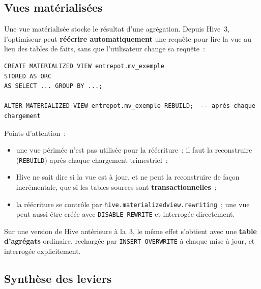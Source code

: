 \subsection{Vues matérialisées}

\noindent Une vue matérialisée stocke le résultat d'une agrégation. Depuis Hive~3, l'optimiseur peut \textbf{réécrire automatiquement} une requête pour lire la vue au lieu des tables de faits, sans que l'utilisateur change sa requête~:

\begin{center}
\begin{minipage}{0.92\textwidth}
\begin{tcolorbox}[colback=title2!6,colframe=title1,boxsep=2pt]
\begin{verbatim}
CREATE MATERIALIZED VIEW entrepot.mv_exemple
STORED AS ORC
AS SELECT ... GROUP BY ...;

ALTER MATERIALIZED VIEW entrepot.mv_exemple REBUILD;  -- après chaque chargement
\end{verbatim}
\end{tcolorbox}
\end{minipage}
\end{center}

\noindent Points d'attention~:
\begin{itemize}
	\item une vue périmée n'est pas utilisée pour la réécriture~; il faut la reconstruire (\texttt{REBUILD}) après chaque chargement trimestriel~;
	\item Hive ne sait dire si la vue est à jour, et ne peut la reconstruire de façon incrémentale, que si les tables sources sont \textbf{transactionnelles}~;
	\item la réécriture se contrôle par \texttt{hive.materializedview.rewriting}~; une vue peut aussi être créée avec \texttt{DISABLE REWRITE} et interrogée directement.
\end{itemize}

\noindent Sur une version de Hive antérieure à la~3, le même effet s'obtient avec une \textbf{table d'agrégats} ordinaire, rechargée par \texttt{INSERT OVERWRITE} à chaque mise à jour, et interrogée explicitement.

\subsection{Synthèse des leviers}

